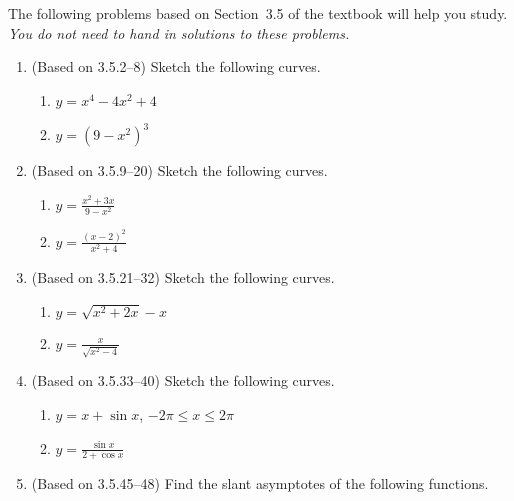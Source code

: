 \documentclass{article}
\title{\commonPSTitleZeroThreeFive}
\author{\commonAuthor}
\date{\commonDateZeroThreeFive}
\newcommand{\ds}{\displaystyle}
\begin{document}
\maketitle
\thispagestyle{empty}

\noindent
The following problems based on Section~3.5 of the textbook will help
you study.  \emph{You do not need to hand in solutions to these
  problems.}
\begin{enumerate}
\item (Based on 3.5.2--8) %
  Sketch the following curves.
  \begin{multicols}{2}
    \begin{enumerate}
    \item $y=x^4-4x^2+4$
    \item $y=(9-x^2)^3$
    \end{enumerate}
  \end{multicols}
\item (Based on 3.5.9--20) %
  Sketch the following curves.
  \begin{multicols}{2}
    \begin{enumerate}
    \item $\ds y = \frac{x^2+3x}{9-x^2}$
    \item $\ds y = \frac{(x-2)^2}{x^2+4}$
    \end{enumerate}
  \end{multicols}
\item (Based on 3.5.21--32) %
  Sketch the following curves.
  \begin{multicols}{2}
    \begin{enumerate}
    \item $y = \sqrt{x^2+2x}-x$
    \item $\ds y = \frac{x}{\sqrt{x^2-4}}$
    \end{enumerate}
  \end{multicols}
\item (Based on 3.5.33--40) %
  Sketch the following curves.
  \begin{multicols}{2}
    \begin{enumerate}
    \item $y = x + \sin x$, $-2\pi \le x \le 2\pi$
    \item $\ds y = \frac{\sin x}{2+\cos x}$
    \end{enumerate}
  \end{multicols}
\item (Based on 3.5.45--48) %
  Find the slant asymptotes of the following functions.
  \begin{multicols}{2}

\end{multicols}
\end{enumerate}
\end{document}
